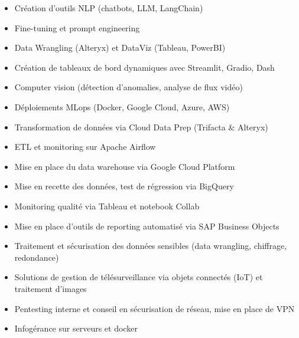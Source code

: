 \documentclass[10pt,a4paper,ragged2e,withhyper]{altacv}
\begin{document}



\makecvheader


\begin{paracol}{2}


\begin{itemize}
\item Création d’outils NLP (chatbots, LLM, LangChain)
\item Fine-tuning et prompt engineering
\item Data Wrangling (Alteryx) et DataViz (Tableau, PowerBI)
\item Création de tableaux de bord dynamiques avec Streamlit, Gradio, Dash
\item Computer vision (détection d'anomalies, analyse de flux vidéo)
\item Déploiements MLops (Docker, Google Cloud, Azure, AWS)
\end{itemize}

\divider

\begin{itemize}
\item Transformation de données via Cloud Data Prep (Trifacta \& Alteryx)
\item ETL et monitoring sur Apache Airflow
\item Mise en place du data warehouse via Google Cloud Platform
\item Mise en recette des données, test de régression via BigQuery
\item Monitoring qualité via Tableau et notebook Collab
\end{itemize}

\divider

\begin{itemize}
\item Mise en place d'outils de reporting automatisé via SAP Business Objects
\item Traitement et sécurisation des données sensibles (data wrangling, chiffrage, redondance)
\item Solutions de gestion de télésurveillance via objets connectés (IoT) et traitement d'images
\item Pentesting interne et conseil en sécurisation de réseau, mise en place de VPN
\item Infogérance sur serveurs et docker
\end{itemize}


\end{paracol}
\end{document}

